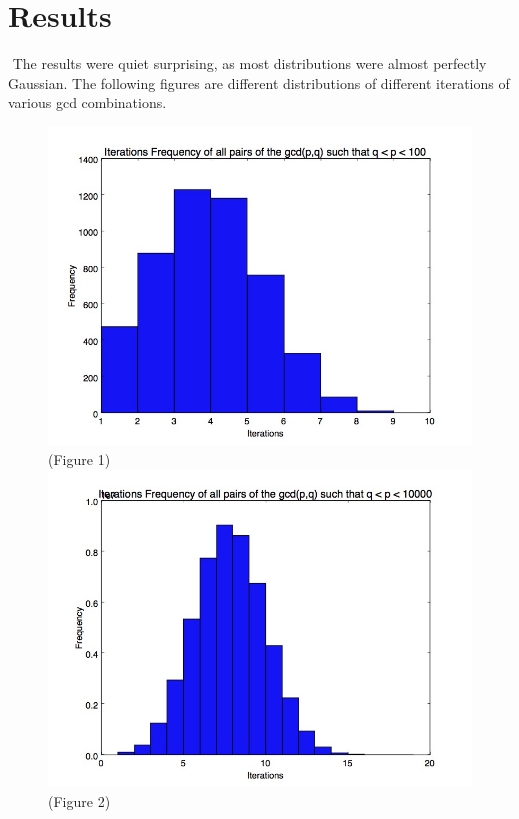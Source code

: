 \documentclass[11pt]{article}
\begin{document}
\section{Results}$ $	\indent The results were quiet surprising, as most distributions were almost perfectly Gaussian. The following figures are different distributions of different iterations of various gcd combinations.\\
	
	\begin{figure}
		
		\center \includegraphics[scale=.4]{2digit_iterationfreq.jpg}
		\center \tiny(Figure 1)\\
		\includegraphics[scale=.4]{4digit_iteration_freq.jpg}
		\center \tiny(Figure 2)
	\end{figure}
	
\end{document}
